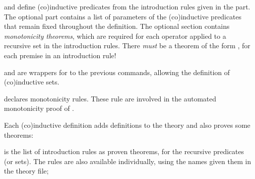 \begin{isabellebody}
\begin{isamarkuptext}
  \begin{description}

  \item \hyperlink{command.HOL.inductive}{\mbox{}} and \hyperlink{command.HOL.coinductive}{\mbox{}} define (co)inductive predicates from the
  introduction rules given in the \hyperlink{keyword.where}{\mbox{}} part.  The
  optional \hyperlink{keyword.for}{\mbox{}} part contains a list of parameters of the
  (co)inductive predicates that remain fixed throughout the
  definition.  The optional \hyperlink{keyword.monos}{\mbox{}} section contains
  \emph{monotonicity theorems}, which are required for each operator
  applied to a recursive set in the introduction rules.  There
  \emph{must} be a theorem of the form ,
  for each premise  in an introduction rule!

  \item \hyperlink{command.HOL.inductive-set}{\mbox{}} and \hyperlink{command.HOL.coinductive-set}{\mbox{}} are wrappers for to the previous commands,
  allowing the definition of (co)inductive sets.

  \item \hyperlink{attribute.HOL.mono}{\mbox{}} declares monotonicity rules.  These
  rule are involved in the automated monotonicity proof of \hyperlink{command.HOL.inductive}{\mbox{}}.

  \end{description}%
\end{isamarkuptext}%
\isamarkuptrue%
%
\isamarkuptrue%
%
\begin{isamarkuptext}%
Each (co)inductive definition  adds definitions to the
  theory and also proves some theorems:

  \begin{description}

  \item {} is the list of introduction rules as proven
  theorems, for the recursive predicates (or sets).  The rules are
  also available individually, using the names given them in the
  theory file;


\end{description}
\end{isamarkuptext}
\end{isabellebody}

